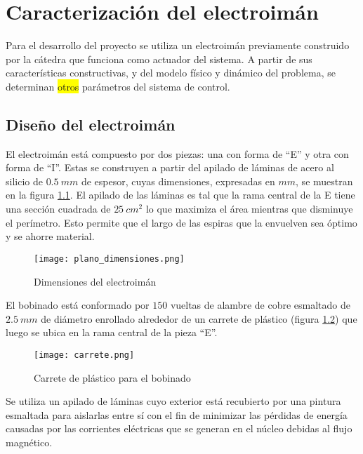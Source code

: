 \chapter{Caracterización del  electroimán}  \label{cap:CaracterizacionElectroiman}

\noindent Para el desarrollo del proyecto se utiliza un electroimán previamente construido por la cátedra que funciona como actuador del sistema. A partir de sus características constructivas, y del modelo físico y dinámico del problema, se determinan \colorbox{yellow}{otros} parámetros del sistema de control.

\section{Diseño del electroimán} \label{section_disenio_electroimán}



\noindent El electroimán está compuesto por dos piezas: una con forma de “E” y otra con forma de “I”. Estas se construyen a partir del apilado de láminas de acero al silicio de $0.5\:mm$ de espesor, cuyas dimensiones, expresadas en $mm$, se muestran en la figura \ref{fig:img_plano_dimensiones}. El apilado de las láminas es tal que la rama central de la E tiene una sección cuadrada de $25\:cm^{2}$ lo que maximiza el área mientras que disminuye el perímetro. Esto permite que el largo de las espiras que la envuelven sea óptimo y se ahorre material.

\begin{figure}[H]
	\centering
	\texttt{[image: plano\_dimensiones.png]}
	\caption{Dimensiones del electroimán}
	\label{fig:img_plano_dimensiones}
\end{figure}

\noindent El bobinado está conformado por $150$ vueltas de alambre de cobre esmaltado de $2.5\:mm$ de diámetro enrollado alrededor de un carrete de plástico (figura \ref{fig:img_carrete}) que luego se ubica en la rama central de la pieza ``E''.

\begin{figure}[H]
	\centering
	\texttt{[image: carrete.png]}
	\caption{Carrete de plástico para el bobinado}
	\label{fig:img_carrete}
\end{figure}


\noindent Se utiliza un apilado de láminas cuyo exterior está recubierto por una pintura esmaltada para aislarlas entre sí con el fin de minimizar las pérdidas de energía causadas por las corrientes eléctricas que se generan en el núcleo debidas al flujo magnético. 

